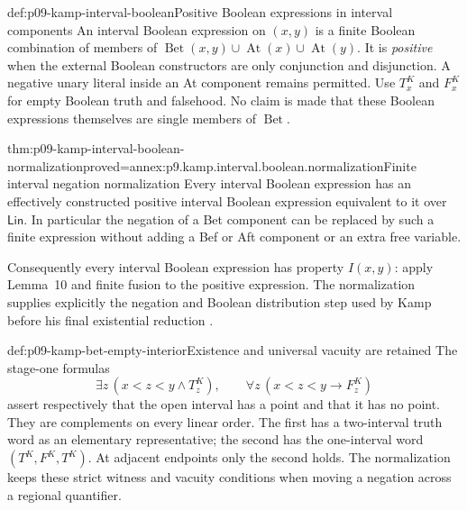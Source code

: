 \begin{hbdefinition}{def:p09-kamp-interval-boolean}{Positive Boolean expressions in interval components}
An interval Boolean expression on \((x,y)\) is a finite Boolean
combination of members of
\(\operatorname{Bet}(x,y)\cup\operatorname{At}(x)\cup
\operatorname{At}(y)\). It is \emph{positive} when the external
Boolean constructors are only conjunction and disjunction. A negative
unary literal inside an At component remains permitted.
Use \(T^K_x\) and \(F^K_x\) for empty Boolean truth and
falsehood. No claim is made that these Boolean expressions themselves
are single members of \(\operatorname{Bet}\).
\end{hbdefinition}

\begin{hblemma}{thm:p09-kamp-interval-boolean-normalization}{proved=annex:p9.kamp.interval.boolean.normalization}{Finite interval negation normalization}
Every interval Boolean expression has an effectively constructed positive
interval Boolean expression equivalent to it over \(\mathsf{Lin}\).
In particular the negation of a Bet component can be replaced by such
a finite expression without adding a Bef or Aft component or an extra
free variable.

Consequently every interval Boolean expression has property \(I(x,y)\):
apply Lemma~10 and finite fusion to the positive expression. The
normalization supplies explicitly the negation and Boolean distribution
step used by Kamp before his final existential reduction
\cite[ch.~III, pp.~61--62, 93]{Kamp1968}.
\end{hblemma}

\begin{hbexample}{def:p09-kamp-bet-empty-interior}{Existence and universal vacuity are retained}
The stage-one formulas
\[
 \exists z\,(x<z<y\land T^K_z),\qquad
 \forall z\,(x<z<y\to F^K_z)
\]
assert respectively that the open interval has a point and that it
has no point. They are complements on every linear order. The first
has a two-interval truth word as an elementary representative; the
second has the one-interval word \((T^K,F^K,T^K)\).
At adjacent endpoints only the second holds. The normalization keeps
these strict witness and vacuity conditions when moving a negation
across a regional quantifier.
\end{hbexample}

